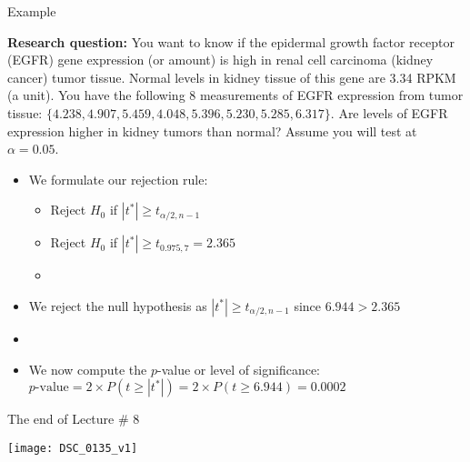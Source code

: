 \documentclass[xcolor=dvipsnames]{beamer}
\begin{document}
\begin{frame}{Example}

{\scriptsize  \textbf{Research question:} You want to know if the epidermal growth factor receptor (EGFR) gene expression (or amount) is high in renal cell carcinoma (kidney cancer) tumor tissue. Normal levels in kidney tissue of this gene are 3.34 RPKM (a unit). You have the following 8 measurements of EGFR expression from tumor tissue: $\{4.238, 4.907, 5.459, 4.048, 5.396, 5.230, 5.285, 6.317\}$. Are levels of EGFR expression higher in kidney tumors than normal? Assume you will test at $\alpha = 0.05$.}

\begin{itemize}
	\item We formulate our rejection rule:   \pause
	\begin{itemize}
		\item Reject $H_0$ if $|t^*| \geq t_{\alpha / 2, n-1}$  \pause
		\item Reject $H_0$ if $|t^*| \geq t_{0.975, 7} = 2.365$  \pause
		\item[] 
	\end{itemize}
	\item We reject the null hypothesis as $|t^*| \geq t_{\alpha / 2, n-1}$ since $6.944 > 2.365$  \pause
	\item[]
	\item We now compute the $p$-value or level of significance: $p\text{-value}=2 \times P(t \geq |t^*|) = 2\times P(t \geq 6.944) = 0.0002$
\end{itemize}
\end{frame}

\begin{frame}{The end of Lecture \# 8}
	\begin{center}
		\texttt{[image: DSC\_0135\_v1]}
	\end{center}
\end{frame}
\end{document}
